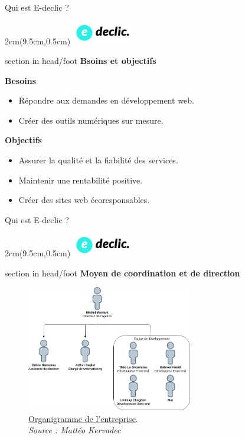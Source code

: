 \documentclass{beamer}
\newcommand{\logoEdeclic}{
	\begin{textblock*}{2cm}(9.5cm,0.5cm)
  		\includegraphics[height=1cm]{../img/logo_e-declic.png}
	\end{textblock*}
}
\begin{document}
\begin{frame}{Qui est E-declic ?}
	\logoEdeclic
	
	\begin{beamercolorbox}[wd=\paperwidth,ht=1.5em,dp=0.5em,leftskip=0.5cm]{section in head/foot}
  		\large \textbf{Bsoins et objectifs}
	\end{beamercolorbox}
	\vspace{0.5em}
	\begin{center}
  		\begin{minipage}{0.9\textwidth}
			\textbf{Besoins}
			\begin{itemize}
				\item Répondre aux demandes en développement web.
				\item Créer des outils numériques sur mesure.
			\end{itemize}
	
			\pause	
	
			\textbf{Objectifs}
			\begin{itemize}
				\item Assurer la qualité et la fiabilité des services.
				\item Maintenir une rentabilité positive.
				\item Créer des sites web écoresponsables.
			\end{itemize}
  		\end{minipage}
	\end{center}
	\vfill
\end{frame}

\begin{frame}{Qui est E-declic ?}
	\logoEdeclic
	
	\begin{beamercolorbox}[wd=\paperwidth,ht=1.5em,dp=0.5em,leftskip=0.5cm]{section in head/foot}
  		\large \textbf{Moyen de coordination et de direction}
	\end{beamercolorbox}
	\vspace{0.5em}
	\begin{center}
  		\begin{minipage}{0.9\textwidth}
			\begin{figure}[t]
  				\includegraphics[height=5.5cm]{../img/coordination.png}
  				\caption{
					\centering    					
    					\href{https://www.e-declic.com/agence-web/equipe/}{\underline{Organigramme de l'entreprise}}.\\
    					\textit{Source : Mattéo Kervadec}
  				}
  				\label{fig:coordination}
  			\end{figure}
  		\end{minipage}
	\end{center}
	\vfill
\end{frame}
\end{document}
